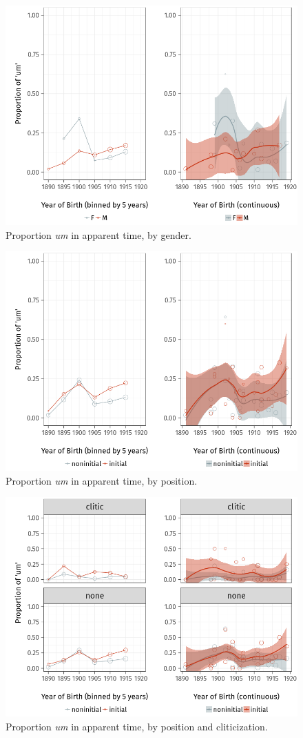 \documentclass[11pt]{article}
\begin{document}
\begin{figure}[htpb]
    \centering
    \includegraphics[width=0.8\linewidth]{figures/apparentgender.png}
    \caption{Proportion \emph{um} in apparent time, by gender.}
    \label{fig:apparentgender}
\end{figure}

\begin{figure}[htpb]
    \centering
    \includegraphics[width=0.8\linewidth]{figures/apparentposition.png}
    \caption{Proportion \emph{um} in apparent time, by position.}
    \label{fig:apparentposition}
\end{figure}

\begin{figure}[htpb]
    \centering
    \includegraphics[width=0.8\linewidth]{figures/apparentclitic.png}
    \caption{Proportion \emph{um} in apparent time, by position and
    cliticization.}
    \label{fig:apparentclitic}
\end{figure}
\end{document}
